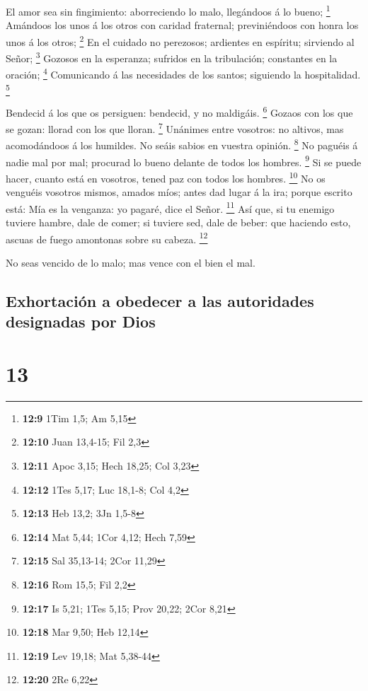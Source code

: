  El amor sea sin fingimiento: aborreciendo lo malo,
llegándoos á lo bueno; \footnote{\textbf{12:9} 1Tim 1,5; Am 5,15}
 Amándoos los unos á los otros con caridad fraternal;
previniéndoos con honra los unos á los otros; \footnote{\textbf{12:10}
  Juan 13,4-15; Fil 2,3}  En el cuidado no perezosos;
ardientes en espíritu; sirviendo al Señor; \footnote{\textbf{12:11} Apoc
  3,15; Hech 18,25; Col 3,23}  Gozosos en la esperanza;
sufridos en la tribulación; constantes en la oración; \footnote{\textbf{12:12}
  1Tes 5,17; Luc 18,1-8; Col 4,2}  Comunicando á las
necesidades de los santos; siguiendo la hospitalidad. \footnote{\textbf{12:13}
  Heb 13,2; 3Jn 1,5-8}

 Bendecid á los que os persiguen: bendecid, y no maldigáis.
\footnote{\textbf{12:14} Mat 5,44; 1Cor 4,12; Hech 7,59} 
Gozaos con los que se gozan: llorad con los que lloran. \footnote{\textbf{12:15}
  Sal 35,13-14; 2Cor 11,29}  Unánimes entre vosotros: no
altivos, mas acomodándoos á los humildes. No seáis sabios en vuestra
opinión. \footnote{\textbf{12:16} Rom 15,5; Fil 2,2}  No
paguéis á nadie mal por mal; procurad lo bueno delante de todos los
hombres. \footnote{\textbf{12:17} Is 5,21; 1Tes 5,15; Prov 20,22; 2Cor
  8,21}  Si se puede hacer, cuanto está en vosotros, tened
paz con todos los hombres. \footnote{\textbf{12:18} Mar 9,50; Heb 12,14}
 No os venguéis vosotros mismos, amados míos; antes dad
lugar á la ira; porque escrito está: Mía es la venganza: yo pagaré, dice
el Señor. \footnote{\textbf{12:19} Lev 19,18; Mat 5,38-44} 
Así que, si tu enemigo tuviere hambre, dale de comer; si tuviere sed,
dale de beber: que haciendo esto, ascuas de fuego amontonas sobre su
cabeza. \footnote{\textbf{12:20} 2Re 6,22}

 No seas vencido de lo malo; mas vence con el bien el mal.

\hypertarget{exhortaciuxf3n-a-obedecer-a-las-autoridades-designadas-por-dios}{%
\subsection{Exhortación a obedecer a las autoridades designadas por
Dios}\label{exhortaciuxf3n-a-obedecer-a-las-autoridades-designadas-por-dios}}

\hypertarget{section-12}{%
\section{13}\label{section-12}}

